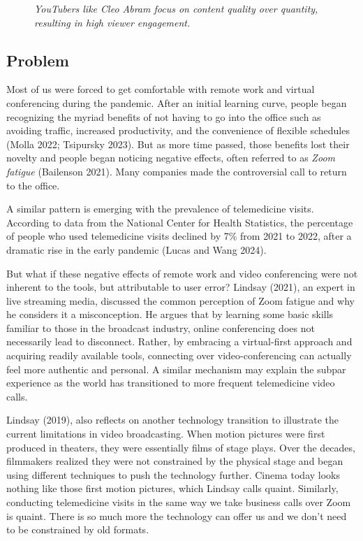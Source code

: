 \documentclass[
  letterpaper,
]{article}
\makeatletter
\newcommand*\pandocbounded[1]{%
  \sbox\pandoc@box{#1}%
  \Gscale@div\@tempa{\textheight}{\dimexpr\ht\pandoc@box+\dp\pandoc@box\relax}%
  \Gscale@div\@tempb{\linewidth}{\wd\pandoc@box}%
  \ifdim\@tempb\p@<\@tempa\p@\let\@tempa\@tempb\fi%
  \ifdim\@tempa\p@<\p@\scalebox{\@tempa}{\usebox\pandoc@box}%
  \else\usebox{\pandoc@box}%
  \fi%
}
\makeatother
\begin{document}
\begin{figure}[H]

{\centering \pandocbounded{\texttt{[image: 3CleoAbram.png]}}

}

\caption{\emph{YouTubers like Cleo Abram focus on content quality over
quantity, resulting in high viewer engagement.}}

\end{figure}%

\subsection{Problem}\label{problem}

Most of us were forced to get comfortable with remote work and virtual
conferencing during the pandemic. After an initial learning curve,
people began recognizing the myriad benefits of not having to go into
the office such as avoiding traffic, increased productivity, and the
convenience of flexible schedules (Molla 2022; Tsipursky 2023). But as
more time passed, those benefits lost their novelty and people began
noticing negative effects, often referred to as \emph{Zoom fatigue}
(Bailenson 2021). Many companies made the controversial call to return
to the office.

A similar pattern is emerging with the prevalence of telemedicine
visits. According to data from the National Center for Health
Statistics, the percentage of people who used telemedicine visits
declined by 7\% from 2021 to 2022, after a dramatic rise in the early
pandemic (Lucas and Wang 2024).

But what if these negative effects of remote work and video conferencing
were not inherent to the tools, but attributable to user error? Lindsay
(2021), an expert in live streaming media, discussed the common
perception of Zoom fatigue and why he considers it a misconception. He
argues that by learning some basic skills familiar to those in the
broadcast industry, online conferencing does not necessarily lead to
disconnect. Rather, by embracing a virtual-first approach and acquiring
readily available tools, connecting over video-conferencing can actually
feel more authentic and personal. A similar mechanism may explain the
subpar experience as the world has transitioned to more frequent
telemedicine video calls.

Lindsay (2019), also reflects on another technology transition to
illustrate the current limitations in video broadcasting. When motion
pictures were first produced in theaters, they were essentially films of
stage plays. Over the decades, filmmakers realized they were not
constrained by the physical stage and began using different techniques
to push the technology further. Cinema today looks nothing like those
first motion pictures, which Lindsay calls quaint. Similarly, conducting
telemedicine visits in the same way we take business calls over Zoom is
quaint. There is so much more the technology can offer us and we don't
need to be constrained by old formats.
\end{document}
